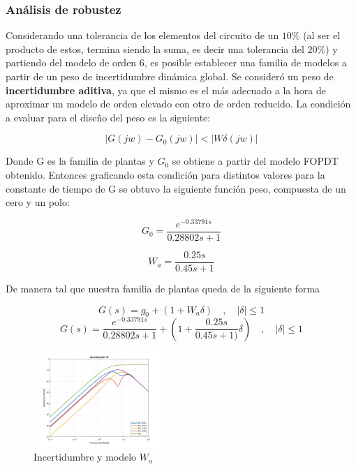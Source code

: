 \documentclass[letterpaper, 10 pt, conference]{ieeeconf}  %
\begin{document}
\subsubsection{Análisis de robustez}

Considerando una tolerancia de los elementos del circuito de un $10\%$ (al ser el producto de estos, termina siendo la suma, es decir una tolerancia del $20\%$) y partiendo del modelo de orden 6, es posible establecer una familia de modelos a partir de un peso de incertidumbre dinámica global. Se consideró un peso de \textbf{incertidumbre aditiva}, ya que el mismo es el más adecuado a la hora de aproximar un modelo de orden elevado con otro de orden reducido. La condición a evaluar para el diseño del peso es la siguiente:

\begin{equation*}
  |G(jw) - G_0(jw)| < |W\delta(jw)|
\end{equation*}

Donde G es la familia de plantas y $G_0$ se obtiene a partir del modelo FOPDT obtenido. Entonces graficando esta condición para distintos valores para la constante de tiempo de G se obtuvo la siguiente función peso, compuesta de un cero y un polo:

\begin{equation*}
  G_0 = \frac{e^{-0.33791s}}{0.28802s+1}
\end{equation*}

\begin{equation*}
  W_a = \frac{0.25s}{0.45s+1}
\end{equation*}

De manera tal que nuestra familia de plantas queda de la siguiente forma

\begin{equation*}
  G(s) = g_0 + (1 + W_{a}\delta)  \hspace{1em},\hspace{1em} |\delta| \leq 1
\end{equation*}
\begin{equation*}
  G(s) = \frac{e^{-0.33791s}}{0.28802s+1} + (1 + \frac{0.25s}{0.45s+1)}\delta) \hspace{1em},\hspace{1em} |\delta| \leq 1
\end{equation*}

\begin{figure}[H]
  \centering
  \includegraphics[width=0.43\textwidth]{./IMAGENES/wa.png}
  \caption{Incertidumbre y modelo $W_a$}
  \label{fig:incertidumbres}
\end{figure}
\end{document}
